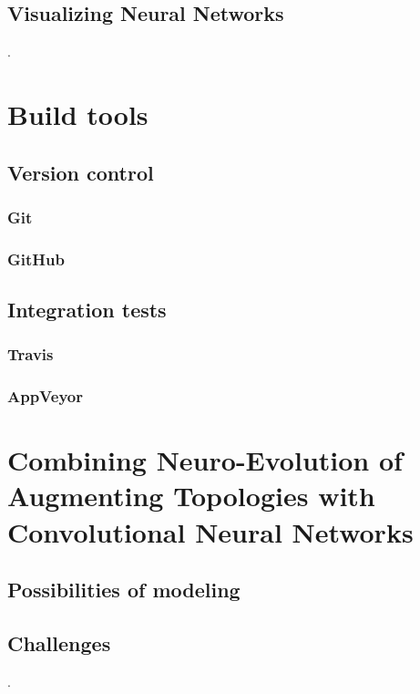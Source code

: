 \documentclass[11pt]{article}
\begin{document}
		\subsection{Visualizing Neural Networks}
			.
	\newpage

	\section{Build tools}
		\subsection{Version control}
			
			\subsubsection{Git}
				
			\subsubsection{GitHub}
				
		\subsection{Integration tests}
			
			\subsubsection{Travis}
				
			\subsubsection{AppVeyor}
				
	\newpage

	\section{Combining Neuro-Evolution of Augmenting Topologies with Convolutional Neural Networks}
		\subsection{Possibilities of modeling}
			
		\subsection{Challenges}
			.
\end{document}
